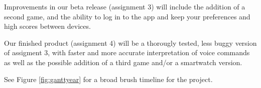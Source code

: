 \documentclass[11pt, oneside]{article}
\newcounter{myWeekNum}
\newcommand{\myWeek}{\themyWeekNum
    \stepcounter{myWeekNum}
    \ifnum\themyWeekNum=53
         \setcounter{myWeekNum}{1}
    \else\fi
}
\begin{document}
Improvements in our beta release (assignment 3) will include the addition of a second game, and the ability to log in to the app and keep your preferences and high scores between devices.

Our finished product (assignment 4) will be a thorougly tested, less buggy version of assigment 3, with faster and more accurate interpretation of voice commands as well as the possible addition of a third game and/or a smartwatch version.

See Figure \ref{fig:ganttyear} for a broad brush timeline for the project.

\end{document}
